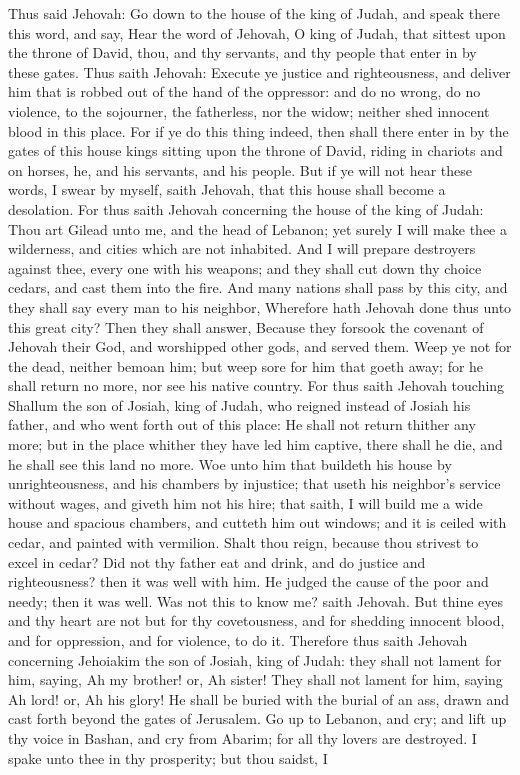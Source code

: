 Thus said Jehovah: Go down to the house of the king of Judah, and speak there this word, and say, Hear the word of Jehovah, O king of Judah, that sittest upon the throne of David, thou, and thy servants, and thy people that enter in by these gates. Thus saith Jehovah: Execute ye justice and righteousness, and deliver him that is robbed out of the hand of the oppressor: and do no wrong, do no violence, to the sojourner, the fatherless, nor the widow; neither shed innocent blood in this place. For if ye do this thing indeed, then shall there enter in by the gates of this house kings sitting upon the throne of David, riding in chariots and on horses, he, and his servants, and his people. But if ye will not hear these words, I swear by myself, saith Jehovah, that this house shall become a desolation. For thus saith Jehovah concerning the house of the king of Judah: Thou art Gilead unto me, and the head of Lebanon; yet surely I will make thee a wilderness, and cities which are not inhabited. And I will prepare destroyers against thee, every one with his weapons; and they shall cut down thy choice cedars, and cast them into the fire. And many nations shall pass by this city, and they shall say every man to his neighbor, Wherefore hath Jehovah done thus unto this great city? Then they shall answer, Because they forsook the covenant of Jehovah their God, and worshipped other gods, and served them.  Weep ye not for the dead, neither bemoan him; but weep sore for him that goeth away; for he shall return no more, nor see his native country. For thus saith Jehovah touching Shallum the son of Josiah, king of Judah, who reigned instead of Josiah his father, and who went forth out of this place: He shall not return thither any more; but in the place whither they have led him captive, there shall he die, and he shall see this land no more.  Woe unto him that buildeth his house by unrighteousness, and his chambers by injustice; that useth his neighbor’s service without wages, and giveth him not his hire; that saith, I will build me a wide house and spacious chambers, and cutteth him out windows; and it is ceiled with cedar, and painted with vermilion. Shalt thou reign, because thou strivest to excel in cedar? Did not thy father eat and drink, and do justice and righteousness? then it was well with him. He judged the cause of the poor and needy; then it was well. Was not this to know me? saith Jehovah. But thine eyes and thy heart are not but for thy covetousness, and for shedding innocent blood, and for oppression, and for violence, to do it. Therefore thus saith Jehovah concerning Jehoiakim the son of Josiah, king of Judah: they shall not lament for him, saying, Ah my brother! or, Ah sister! They shall not lament for him, saying Ah lord! or, Ah his glory! He shall be buried with the burial of an ass, drawn and cast forth beyond the gates of Jerusalem.  Go up to Lebanon, and cry; and lift up thy voice in Bashan, and cry from Abarim; for all thy lovers are destroyed. I spake unto thee in thy prosperity; but thou saidst, I 